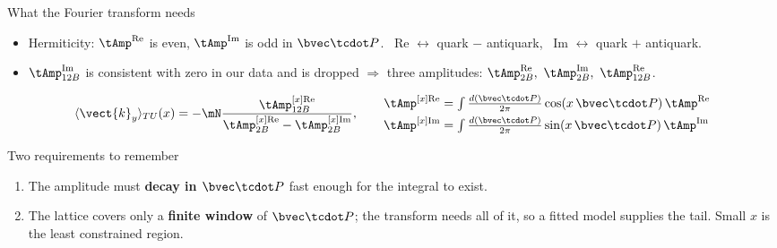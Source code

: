 \begin{frame}{What the Fourier transform needs}
  \begin{itemize}
    \item Hermiticity: $\tAmp^{\text{Re}}$ is even, $\tAmp^{\text{Im}}$ is odd in $\bvec\tcdot P$. \ Re $\leftrightarrow$ quark $-$ antiquark, \ Im $\leftrightarrow$ quark $+$ antiquark.
    \item $\tAmp_{12B}^{\text{Im}}$ is consistent with zero in our data and is dropped $\Rightarrow$ three amplitudes: $\tAmp_{2B}^{\text{Re}},\ \tAmp_{2B}^{\text{Im}},\ \tAmp_{12B}^{\text{Re}}$.
  \end{itemize}
  \[ \langle \vect{k}_y \rangle_{TU}(x) = -\mN \frac{\tAmp_{12B}^{[x]\text{Re}}}{\tAmp_{2B}^{[x]\text{Re}}-\tAmp_{2B}^{[x]\text{Im}}},
     \qquad \begin{aligned} \tAmp^{[x]\text{Re}} &= \textstyle\int \frac{d(\bvec\tcdot P)}{2\pi}\cos(x\,\bvec\tcdot P)\,\tAmp^{\text{Re}} \\ \tAmp^{[x]\text{Im}} &= \textstyle\int \frac{d(\bvec\tcdot P)}{2\pi}\sin(x\,\bvec\tcdot P)\,\tAmp^{\text{Im}} \end{aligned} \]
  \begin{alertblock}{Two requirements to remember}
    \begin{enumerate}
      \item The amplitude must \textbf{decay in $\bvec\tcdot P$} fast enough for the integral to exist.
      \item The lattice covers only a \textbf{finite window} of $\bvec\tcdot P$; the transform needs all of it, so a fitted model supplies the tail. Small $x$ is the least constrained region.
    \end{enumerate}
  \end{alertblock}
\end{frame}

